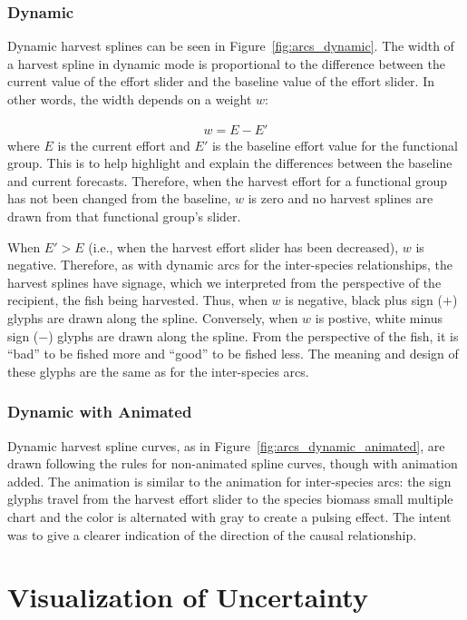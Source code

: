 \subsubsection{Dynamic}

Dynamic harvest splines can be seen in Figure~\ref{fig:arcs_dynamic}.  The width of a harvest spline in dynamic mode is proportional to the difference between the current value of the effort slider and the baseline value of the effort slider.  In other words, the width depends on a weight $w$:

\begin{align}
w = E - E'
\end{align}
where $E$ is the current effort and $E'$ is the baseline effort value for the functional group.  This is to help highlight and explain the differences between the baseline and current forecasts.   Therefore, when the harvest effort for a functional group has not been changed from the baseline, $w$ is zero and no harvest splines are drawn from that functional group's slider.

When $E' > E$ (i.e., when the harvest effort slider has been decreased), $w$ is negative.  Therefore, as with dynamic arcs for the inter-species relationships, the harvest splines have signage, which we interpreted from the perspective of the recipient, the fish being harvested.  Thus, when $w$ is negative, black plus sign ($+$) glyphs are drawn along the spline.  Conversely, when $w$ is postive, white minus sign ($-$) glyphs are drawn along the spline.  From the perspective of the fish, it is ``bad'' to be fished more and ``good'' to be fished less.  The meaning and design of these glyphs are the same as for the inter-species arcs.

\subsubsection{Dynamic with Animated}

Dynamic harvest spline curves, as in Figure~\ref{fig:arcs_dynamic_animated}, are drawn following the rules for non-animated spline curves, though with animation added.  The animation is similar to the animation for inter-species arcs:  the sign glyphs travel from the harvest effort slider to the species biomass small multiple chart and the color is alternated with gray to create a pulsing effect.  The intent was to give a clearer indication of the direction of the causal relationship.

\section{Visualization of Uncertainty}

